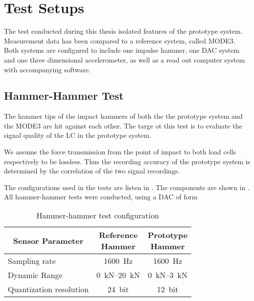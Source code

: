 \chapter{Test Setups}
\label{chap:\currfilebase}

The test conducted during this thesis isolated features of the prototype system. Measurement data has been compared to a reference system, called MODE3. Both systems are configured to include one impulse hammer, one \ac{DAC} system and one three dimensional accelerometer, as well as a read out computer system with accompanying software.

\section{Hammer-Hammer Test}

The hammer tips of the impact hammers of both the the prototype system and the MODE3 are hit against each other. The targe ot this test is to evaluate the signal quality of the \ac{LC} in the prototype system.

We assume the force transmission from the point of impact to both load cells respectively to be lossless. Thus the recording accuracy of the prototype system is determined by the correlation of the two signal recordings.

The configurations used in the tests are listen in . The components are shown in . All hammer-hammer tests were conducted, using a \ac{DAC} of form 

\begin{table}
    \centering
    {\renewcommand{\arraystretch}{1}%
    \footnotesize
    \begin{tabular}{lcc}
        \toprule
        \multicolumn{1}{c}{Sensor Parameter} & \makecell{Reference\\Hammer} & \makecell{Prototype\\Hammer}\\
        \midrule
        Sampling rate & \SI{1600}{\hertz} & \SI{1600}{\hertz}\\
        Dynamic Range & \SIrange{0}{20}{\kilo\newton} & \SIrange{0}{3}{\kilo\newton}\\
        Quantization resolution & \SI{24}{bit} & \SI{12}{bit}\\
        \bottomrule
    \end{tabular}
    \caption[Hammer-Hammer Test Configuration]{Hammer-hammer test configuration}
    \label{tab:hh_config}
    \normalsize
    }
\end{table}

